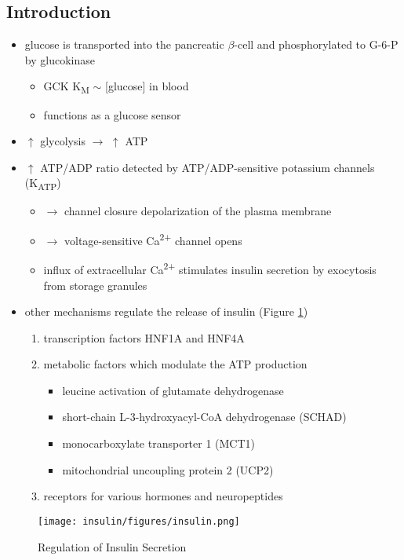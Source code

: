 \documentclass[12pt]{scrartcl}
\begin{document}
\subsection{Introduction}
\label{sec:orgb05bc31}
\begin{itemize}
\item glucose is transported into the pancreatic \(\beta\)-cell and phosphorylated to G-6-P by glucokinase
\begin{itemize}
\item GCK K\textsubscript{M} \(\sim\) [glucose] in blood
\item functions as a glucose sensor
\end{itemize}
\item \(\uparrow\) glycolysis \(\to\) \(\uparrow\) ATP
\item \(\uparrow\) ATP/ADP ratio detected by ATP/ADP-sensitive potassium channels (K\textsubscript{ATP})
\begin{itemize}
\item \(\to\) channel closure depolarization of the plasma membrane
\item \(\to\) voltage-sensitive Ca\textsuperscript{2+} channel opens
\item influx of extracellular Ca\textsuperscript{2+} stimulates insulin secretion by
exocytosis from storage granules
\end{itemize}

\item other mechanisms regulate the release of insulin (Figure \ref{fig:org54e2b03})
\begin{enumerate}
\item transcription factors HNF1A and HNF4A
\item metabolic factors which modulate the ATP production
\begin{itemize}
\item leucine activation of glutamate dehydrogenase
\item short-chain L-3-hydroxyacyl-CoA dehydrogenase (SCHAD)
\item monocarboxylate transporter 1 (MCT1)
\item mitochondrial uncoupling protein 2 (UCP2)
\end{itemize}
\item receptors for various hormones and neuropeptides
\end{enumerate}
\end{itemize}



\begin{figure}[htbp]
\centering
\texttt{[image: insulin/figures/insulin.png]}
\caption[insulin]{\label{fig:org54e2b03}Regulation of Insulin Secretion}
\end{figure}
\end{document}

